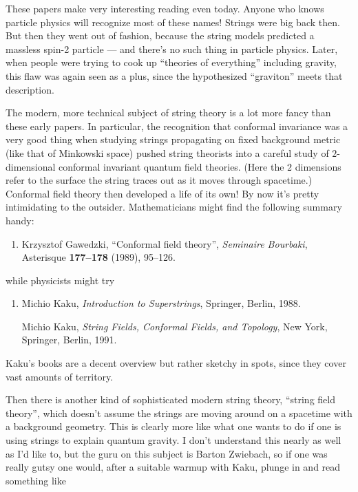 \documentclass{article}
\def\tightlist{}
\begin{document}
These papers make very interesting reading even today. Anyone who knows
particle physics will recognize most of these names! Strings were big
back then. But then they went out of fashion, because the string models
predicted a massless spin-2 particle --- and there's no such thing in
particle physics. Later, when people were trying to cook up ``theories
of everything'' including gravity, this flaw was again seen as a plus,
since the hypothesized ``graviton'' meets that description.

The modern, more technical subject of string theory is a lot more fancy
than these early papers. In particular, the recognition that conformal
invariance was a very good thing when studying strings propagating on
fixed background metric (like that of Minkowski space) pushed string
theorists into a careful study of \(2\)-dimensional conformal invariant
quantum field theories. (Here the 2 dimensions refer to the surface the
string traces out as it moves through spacetime.) Conformal field theory
then developed a life of its own! By now it's pretty intimidating to the
outsider. Mathematicians might find the following summary handy:

\begin{enumerate}
\def\labelenumi{\arabic{enumi})}
\setcounter{enumi}{1}
\tightlist
\item
  Krzysztof Gawedzki, ``Conformal field theory'', \emph{Seminaire
  Bourbaki}, Asterisque \textbf{177--178} (1989), 95--126.
\end{enumerate}
\noindent
while physicists might try

\begin{enumerate}
\def\labelenumi{\arabic{enumi})}
\setcounter{enumi}{2}
\item
  Michio Kaku, \emph{Introduction to Superstrings},
  Springer, Berlin, 1988.

   Michio Kaku, \emph{String Fields, Conformal Fields, and Topology}, 
  New York, Springer, Berlin, 1991.
\end{enumerate}
\noindent
Kaku's books are a decent overview but rather sketchy in spots, since
they cover vast amounts of territory.

Then there is another kind of sophisticated modern string theory,
``string field theory'', which doesn't assume the strings are moving
around on a spacetime with a background geometry. This is clearly more
like what one wants to do if one is using strings to explain quantum
gravity. I don't understand this nearly as well as I'd like to, but the
guru on this subject is Barton Zwiebach, so if one was really gutsy one
would, after a suitable warmup with Kaku, plunge in and read something
like
\end{document}

